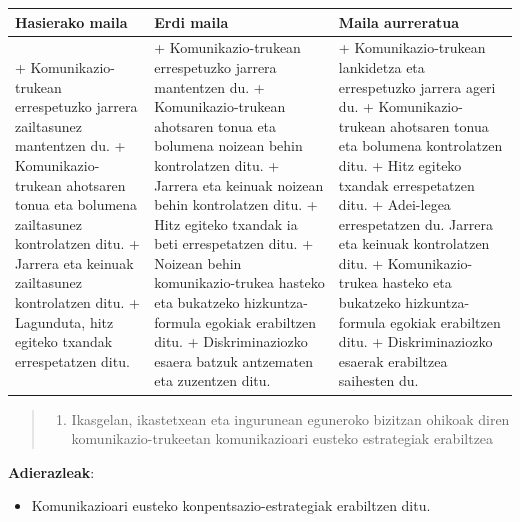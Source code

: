 \documentclass[
]{book}
\providecommand{\tightlist}{%
  \setlength{\itemsep}{0pt}\setlength{\parskip}{0pt}}
\begin{document}
\begin{longtable}[]{@{}
  >{\raggedright\arraybackslash}p{}
  >{\raggedright\arraybackslash}p{}
  >{\raggedright\arraybackslash}p{}@{}}
\toprule
Hasierako maila & Erdi maila & Maila aurreratua \\
\midrule
\endhead
+ Komunikazio-trukean errespetuzko jarrera zailtasunez mantentzen du. + Komunikazio-trukean ahotsaren tonua eta bolumena zailtasunez kontrolatzen ditu. + Jarrera eta keinuak zailtasunez kontrolatzen ditu. + Lagunduta, hitz egiteko txandak errespetatzen ditu. & + Komunikazio-trukean errespetuzko jarrera mantentzen du. + Komunikazio-trukean ahotsaren tonua eta bolumena noizean behin kontrolatzen ditu. + Jarrera eta keinuak noizean behin kontrolatzen ditu. + Hitz egiteko txandak ia beti errespetatzen ditu. + Noizean behin komunikazio-trukea hasteko eta bukatzeko hizkuntza-formula egokiak erabiltzen ditu. + Diskriminaziozko esaera batzuk antzematen eta zuzentzen ditu. & + Komunikazio-trukean lankidetza eta errespetuzko jarrera ageri du. + Komunikazio-trukean ahotsaren tonua eta bolumena kontrolatzen ditu. + Hitz egiteko txandak errespetatzen ditu. + Adei-legea errespetatzen du. Jarrera eta keinuak kontrolatzen ditu. + Komunikazio-trukea hasteko eta bukatzeko hizkuntza-formula egokiak erabiltzen ditu. + Diskriminaziozko esaerak erabiltzea saihesten du. \\
\bottomrule
\end{longtable}

\begin{quote}
\begin{enumerate}
\def\labelenumi{(\arabic{enumi})}
\setcounter{enumi}{20}
\tightlist
\item
  Ikasgelan, ikastetxean eta ingurunean eguneroko bizitzan ohikoak diren komunikazio-trukeetan komunikazioari eusteko estrategiak erabiltzea
\end{enumerate}
\end{quote}

\textbf{Adierazleak}:

\begin{itemize}
\tightlist
\item
  Komunikazioari eusteko konpentsazio-estrategiak erabiltzen ditu.
\end{itemize}
\end{document}
